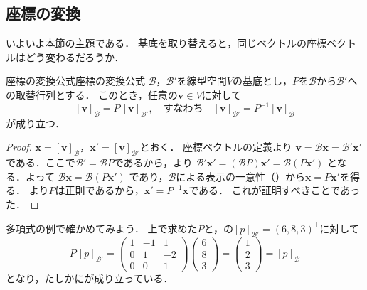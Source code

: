 \subsection{座標の変換}

いよいよ本節の主題である．
基底を取り替えると，同じベクトルの座標ベクトルはどう変わるだろうか．

\begin{theorem}{座標の変換公式}{座標の変換公式}
  $\mathcal{B}$，$\mathcal{B}'$を線型空間$V$の基底とし，$P$を$\mathcal{B}$から$\mathcal{B}'$への取替行列とする．
  このとき，任意の$\bm{v} \in V$に対して
  \[
    [\bm{v}]_{\mathcal{B}} = P \, [\bm{v}]_{\mathcal{B}'},
    \quad \text{すなわち} \quad
    [\bm{v}]_{\mathcal{B}'} = P^{-1} [\bm{v}]_{\mathcal{B}}
  \]
  が成り立つ．
\end{theorem}

\begin{tleftbar}
\begin{proof}
  $\bm{x} = [\bm{v}]_{\mathcal{B}}$，$\bm{x}' = [\bm{v}]_{\mathcal{B}'}$とおく．
  座標ベクトルの定義より
  $\bm{v} = \mathcal{B}\bm{x} = \mathcal{B}'\bm{x}'$
  である．ここで$\mathcal{B}' = \mathcal{B}P$であるから，より
  $\mathcal{B}'\bm{x}' = (\mathcal{B}P)\bm{x}' = \mathcal{B}(P\bm{x}')$
  となる．よって
  $\mathcal{B}\bm{x} = \mathcal{B}(P\bm{x}')$
  であり，$\mathcal{B}$による表示の一意性（）から$\bm{x} = P\bm{x}'$を得る．
  より$P$は正則であるから，$\bm{x}' = P^{-1}\bm{x}$である．
  これが証明すべきことであった．
\end{proof}
\end{tleftbar}

多項式の例で確かめてみよう．
上で求めた$P$と，の$[p]_{\mathcal{B}'}=(6,8,3)^\mathsf{T}$に対して
\[
  P\,[p]_{\mathcal{B}'}
  =\begin{pmatrix} 1 & -1 & 1 \\ 0 & 1 & -2 \\ 0 & 0 & 1 \end{pmatrix}
  \begin{pmatrix} 6 \\ 8 \\ 3 \end{pmatrix}
  =\begin{pmatrix} 1 \\ 2 \\ 3 \end{pmatrix}
  =[p]_{\mathcal{B}}
\]
となり，たしかにが成り立っている．

